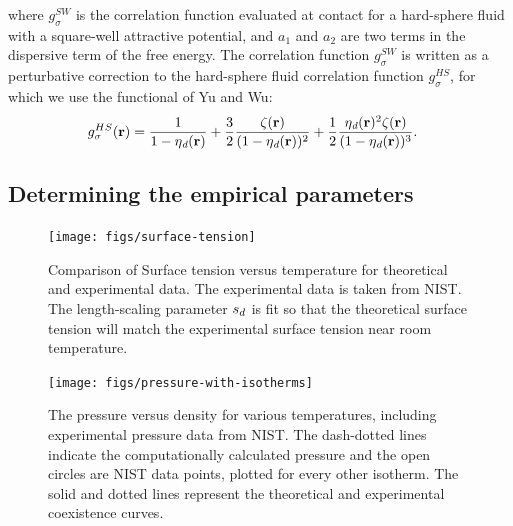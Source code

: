 \documentclass[letterpaper,twocolumn,amsmath,amssymb,prb]{revtex4-1}
\newcommand{\xx}{\textbf{r}}
\begin{document}
where $g^\textit{SW}_\sigma$ is the correlation function evaluated at
contact for a hard-sphere fluid with a square-well attractive
potential, and $a_1$ and $a_2$ are two terms in the dispersive term of
the free energy.  The correlation function $g^\textit{SW}_\sigma$ is
written as a perturbative correction to the hard-sphere fluid correlation
function $g^\textit{HS}_\sigma$, for which we use the functional of Yu and
Wu\cite{yu2002fmt-dft-inhomogeneous-associating}:
\begin{align}
  g_\sigma^{HS}(\xx) &= \frac{1}{1-\etadisp(\xx)}
  +\frac32\frac{\zeta(\xx)}{(1-\etadisp(\xx))^2}
  + \frac12\frac{\etadisp(\xx)^2\zeta(\xx)}{(1-\etadisp(\xx))^3}.
\end{align}

\subsection{Determining the empirical parameters}\label{sec:empirical}

\begin{figure}
\begin{center}
\texttt{[image: figs/surface-tension]}
\end{center}
\caption{Comparison of Surface tension versus temperature for theoretical and
  experimental data. The experimental data is taken from NIST.\cite{nistwater}
  The length-scaling parameter $s_d$ is fit so that the theoretical surface 
  tension will match the experimental surface tension near room temperature.}
\label{fig:surface-tension}
\end{figure}

\begin{figure}
\begin{center}
\texttt{[image: figs/pressure-with-isotherms]}
\end{center}
\caption{The pressure versus density for various temperatures, including
experimental pressure data from NIST\cite{nistwater}. The dash-dotted lines
indicate the computationally calculated pressure and the open circles are 
NIST data points, plotted for every other isotherm. The solid and dotted lines
represent the theoretical and experimental coexistence curves.}
\label{fig:pressure-with-isotherms}
\end{figure}
\end{document}
